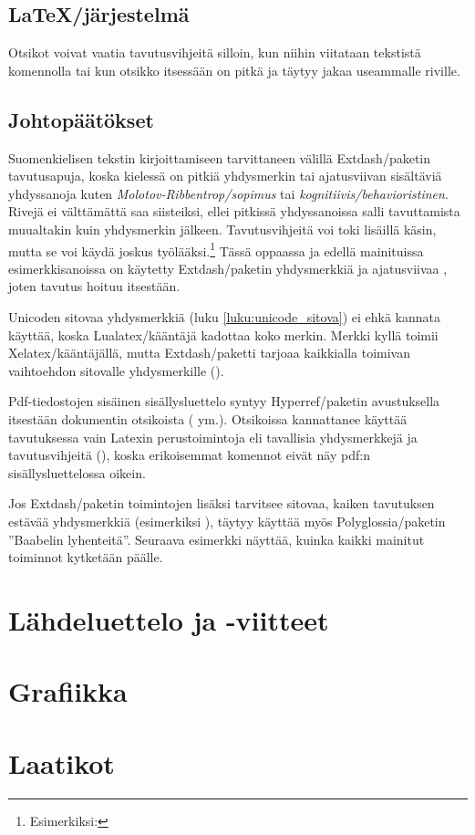 \begin{koodilohkosis}
  \section[Latex-jär\-jes\-tel\-mä]{\LaTeX\-/järjestelmä}
\end{koodilohkosis}

Otsikot voivat vaatia tavutusvihjeitä silloin, kun niihin viitataan
tekstistä komennolla  tai kun otsikko itsessään on
pitkä ja täytyy jakaa useammalle riville.

\subsection{Johtopäätökset}

Suomenkielisen tekstin kirjoittamiseen tarvittaneen välillä
Extdash\-/paketin tavutus\-apuja, koska kielessä on pitkiä yhdysmerkin
tai ajatusviivan sisältäviä yhdyssanoja kuten
\emph{Molotov\--Ribben\-trop\-/sopimus} tai
\emph{kognitiivis\-/behavioristinen}. Rivejä ei välttämättä saa
siisteiksi, ellei pitkissä yhdyssanoissa salli tavuttamista muualtakin
kuin yhdysmerkin jälkeen. Tavutusvihjeitä voi toki lisäillä käsin, mutta
se voi käydä joskus työlääksi.\footnote{Esimerkiksi:
  } Tässä oppaassa ja
edellä mainituissa esimerkkisanoissa on käytetty Extdash\-/paketin
yhdysmerkkiä \koodi{\keno -/} ja ajatusviivaa \koodi{\keno --}, joten
tavutus hoituu itsestään.

Unicoden sitovaa yhdysmerkkiä (luku \ref{luku:unicode_sitova}) ei ehkä
kannata käyttää, koska Lualatex\-/kääntäjä kadottaa koko merkin. Merkki
kyllä toimii Xelatex\-/kääntäjällä, mutta Extdash\-/paketti tarjoaa
kaikkialla toimivan vaihtoehdon sitovalle yhdysmerkille (\koodi{\keno
  =/}).

Pdf-tiedostojen sisäinen sisällysluettelo syntyy Hyperref\-/paketin
avustuksella itsestään dokumentin otsikoista (
ym.). Otsikoissa kannattanee käyttää tavutuksessa vain Latexin
perustoimintoja eli tavallisia yhdysmerkkejä ja tavutusvihjeitä
(\koodi{\keno-}), koska erikoisemmat komennot eivät näy pdf:n
sisällysluettelossa oikein.

Jos Extdash\-/paketin toimintojen lisäksi tarvitsee sitovaa, kaiken
tavutuksen estävää yhdysmerkkiä (esimerkiksi
), täytyy käyttää myös
Polyglossia\-/paketin ''Baabelin lyhenteitä''. Seuraava esimerkki
näyttää, kuinka kaikki mainitut toiminnot kytketään päälle.

\begin{koodilohkosis}
  \usepackage{polyglossia}
  \usepackage[shortcuts]{extdash}
  \setdefaultlanguage[babelshorthands]{finnish}
\end{koodilohkosis}

\section{Lähdeluettelo ja -viitteet}
\section{Grafiikka}
\section{Laatikot}
